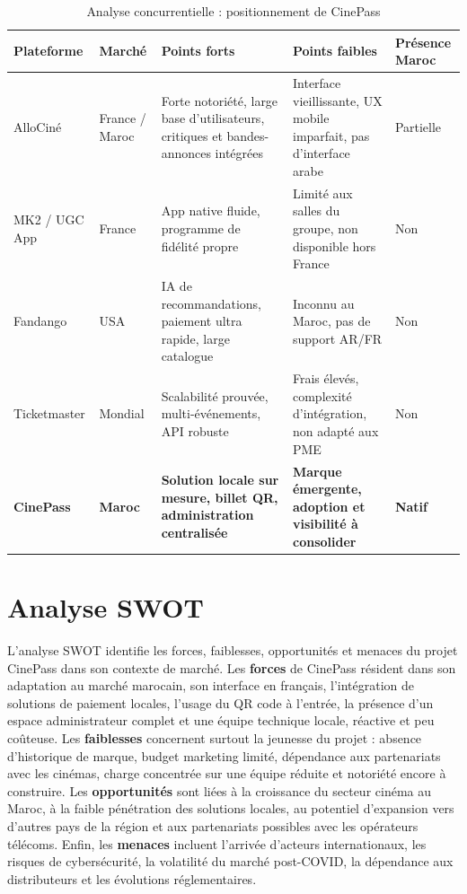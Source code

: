 \documentclass[12pt]{report}
\begin{document}
\begin{table}[H]
\centering
\scriptsize
\setlength{\tabcolsep}{2.5pt}
\renewcommand{\arraystretch}{1.02}
\begin{tabularx}{\textwidth}{|p{2.2cm}|p{1.8cm}|X|X|p{1.8cm}|}
\hline
\textbf{Plateforme} & \textbf{Marché} & \textbf{Points forts} & \textbf{Points faibles} & \textbf{Présence Maroc} \\
\hline
AlloCiné & France / Maroc & Forte notoriété, large base d'utilisateurs, critiques et bandes-annonces intégrées & Interface vieillissante, UX mobile imparfait, pas d'interface arabe & Partielle \\
\hline
MK2 / UGC App & France & App native fluide, programme de fidélité propre & Limité aux salles du groupe, non disponible hors France & Non \\
\hline
Fandango & USA & IA de recommandations, paiement ultra rapide, large catalogue & Inconnu au Maroc, pas de support AR/FR & Non \\
\hline
Ticketmaster & Mondial & Scalabilité prouvée, multi-événements, API robuste & Frais élevés, complexité d'intégration, non adapté aux PME & Non \\
\hline
\textbf{CinePass} & \textbf{Maroc} & \textbf{Solution locale sur mesure, billet QR, administration centralisée} & \textbf{Marque émergente, adoption et visibilité à consolider} & \textbf{Natif} \\
\hline
\end{tabularx}
\caption{Analyse concurrentielle : positionnement de CinePass}
\label{tab:analyse-concurrentielle}
\end{table}

\section{Analyse SWOT}
L'analyse SWOT identifie les forces, faiblesses, opportunités et menaces du projet CinePass dans son contexte de marché.
Les \textbf{forces} de CinePass résident dans son adaptation au marché marocain, son interface en français, l'intégration de solutions de paiement locales, l'usage du QR code à l'entrée, la présence d'un espace administrateur complet et une équipe technique locale, réactive et peu coûteuse. Les \textbf{faiblesses} concernent surtout la jeunesse du projet : absence d'historique de marque, budget marketing limité, dépendance aux partenariats avec les cinémas, charge concentrée sur une équipe réduite et notoriété encore à construire. Les \textbf{opportunités} sont liées à la croissance du secteur cinéma au Maroc, à la faible pénétration des solutions locales, au potentiel d'expansion vers d'autres pays de la région et aux partenariats possibles avec les opérateurs télécoms. Enfin, les \textbf{menaces} incluent l'arrivée d'acteurs internationaux, les risques de cybersécurité, la volatilité du marché post-COVID, la dépendance aux distributeurs et les évolutions réglementaires.
\end{document}
